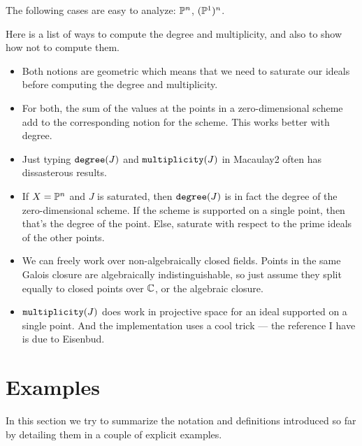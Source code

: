 \documentclass[fleqn,reqno]{amsart}
\numberwithin{first}{chapter}
\begin{document}
\begin{example}
The following cases are easy to analyze: $\mathbb{P}^n$, $(\mathbb{P}^1)^n$.
\end{example}

\begin{example}
Here is a list of ways to compute the degree and multiplicity, and also
to show how not to compute them.
\begin{itemize}
	\item Both notions are geometric which means that we need to saturate our ideals
	before computing the degree and multiplicity.
	\item For both, the sum of the values at the points in a zero-dimensional scheme
	add to the corresponding notion for the scheme.
	This works better with degree.
	\item Just typing $\mathop{\tt degree}(J)$ and $\mathop{\tt multiplicity}(J)$ in Macaulay2 often
	has dissasterous results.
	\item If $X=\mathbb{P}^n$ and $J$ is saturated, then $\mathop{\tt degree}(J)$ is in fact the degree
	of the zero-dimensional scheme.
	If the scheme is supported on a single point, then that's the degree of the point.
	Else, saturate with respect to the prime ideals of the other points.
	\item We can freely work over non-algebraically closed fields.
	Points in the same Galois closure are algebraically indistinguishable,
	so just assume they split equally to closed points over $\mathbb{C}$, or the algebraic closure.
	\item $\mathop{\tt multiplicity}(J)$ does work in projective space for an ideal supported
	on a single point.
	And the implementation uses a cool trick --- the reference I have is due to Eisenbud.
\end{itemize}
\end{example}

\section{Examples}

In this section we try to summarize the notation and definitions introduced so far
by detailing them in a couple of explicit examples.
\end{document}
